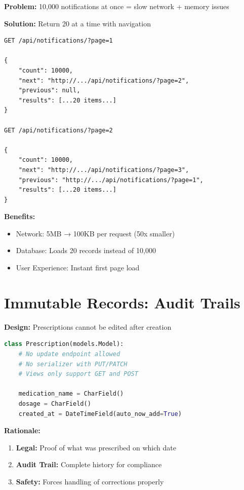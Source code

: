 \documentclass[11pt,a4paper,twoside]{report}
\begin{document}
\textbf{Problem:} 10,000 notifications at once = slow network + memory issues

\textbf{Solution:} Return 20 at a time with navigation

\begin{lstlisting}
GET /api/notifications/?page=1

{
    "count": 10000,
    "next": "http://.../api/notifications/?page=2",
    "previous": null,
    "results": [...20 items...]
}

GET /api/notifications/?page=2

{
    "count": 10000,
    "next": "http://.../api/notifications/?page=3",
    "previous": "http://.../api/notifications/?page=1",
    "results": [...20 items...]
}
\end{lstlisting}

\textbf{Benefits:}
\begin{itemize}
    \item Network: 5MB → 100KB per request (50x smaller)
    \item Database: Loads 20 records instead of 10,000
    \item User Experience: Instant first page load
\end{itemize}

\section{Immutable Records: Audit Trails}

\textbf{Design:} Prescriptions cannot be edited after creation

\begin{lstlisting}[language=Python]
class Prescription(models.Model):
    # No update endpoint allowed
    # No serializer with PUT/PATCH
    # Views only support GET and POST
    
    medication_name = CharField()
    dosage = CharField()
    created_at = DateTimeField(auto_now_add=True)
\end{lstlisting}

\textbf{Rationale:}
\begin{enumerate}
    \item \textbf{Legal:} Proof of what was prescribed on which date
    \item \textbf{Audit Trail:} Complete history for compliance
    \item \textbf{Safety:} Forces handling of corrections properly
\end{enumerate}
\end{document}
